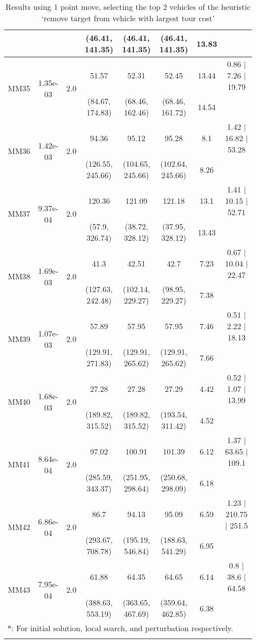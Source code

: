\begin{longtable}{|c|c|c|c|c|c|c|c|}
	 &  &  & (46.41, 141.35) & (46.41, 141.35) & (46.41, 141.35) & 13.83 & \\
 	\hline
	\multirow{2}{*}{MM35} & \multirow{2}{*}{1.35e-03} & \multirow{2}{*}{2.0} & 51.57 & 52.31 & 52.45 & 13.44 & 0.86 $\mid$ 7.26 $\mid$ 19.79\\
	 &  &  & (84.67, 174.83) & (68.46, 162.46) & (68.46, 161.72) & 14.54 & \\
 	\hline
	\multirow{2}{*}{MM36} & \multirow{2}{*}{1.42e-03} & \multirow{2}{*}{2.0} & 94.36 & 95.12 & 95.28 & 8.1 & 1.42 $\mid$ 16.82 $\mid$ 53.28\\
	 &  &  & (126.55, 245.66) & (104.65, 245.66) & (102.64, 245.66) & 8.26 & \\
 	\hline
	\multirow{2}{*}{MM37} & \multirow{2}{*}{9.37e-04} & \multirow{2}{*}{2.0} & 120.36 & 121.09 & 121.18 & 13.1 & 1.41 $\mid$ 10.15 $\mid$ 52.71\\
	 &  &  & (57.9, 326.74) & (38.72, 328.12) & (37.95, 328.12) & 13.43 & \\
 	\hline
	\multirow{2}{*}{MM38} & \multirow{2}{*}{1.69e-03} & \multirow{2}{*}{2.0} & 41.3 & 42.51 & 42.7 & 7.23 & 0.67 $\mid$ 10.04 $\mid$ 22.47\\
	 &  &  & (127.63, 242.48) & (102.14, 229.27) & (98.95, 229.27) & 7.38 & \\
 	\hline
	\multirow{2}{*}{MM39} & \multirow{2}{*}{1.07e-03} & \multirow{2}{*}{2.0} & 57.89 & 57.95 & 57.95 & 7.46 & 0.51 $\mid$ 2.22 $\mid$ 18.13\\
	 &  &  & (129.91, 271.83) & (129.91, 265.62) & (129.91, 265.62) & 7.66 & \\
 	\hline
	\multirow{2}{*}{MM40} & \multirow{2}{*}{1.68e-03} & \multirow{2}{*}{2.0} & 27.28 & 27.28 & 27.29 & 4.42 & 0.52 $\mid$ 1.07 $\mid$ 13.99\\
	 &  &  & (189.82, 315.52) & (189.82, 315.52) & (193.54, 311.42) & 4.52 & \\
 	\hline
	\multirow{2}{*}{MM41} & \multirow{2}{*}{8.64e-04} & \multirow{2}{*}{2.0} & 97.02 & 100.91 & 101.39 & 6.12 & 1.37 $\mid$ 63.65 $\mid$ 109.1\\
	 &  &  & (285.59, 343.37) & (251.95, 298.64) & (250.68, 298.09) & 6.18 & \\
 	\hline
	\multirow{2}{*}{MM42} & \multirow{2}{*}{6.86e-04} & \multirow{2}{*}{2.0} & 86.7 & 94.13 & 95.09 & 6.59 & 1.23 $\mid$ 210.75 $\mid$ 251.5\\
	 &  &  & (293.67, 708.78) & (195.19, 546.84) & (188.63, 541.29) & 6.95 & \\
 	\hline
	\multirow{2}{*}{MM43} & \multirow{2}{*}{7.95e-04} & \multirow{2}{*}{2.0} & 61.88 & 64.35 & 64.65 & 6.14 & 0.8 $\mid$ 38.6 $\mid$ 64.58\\
	 &  &  & (388.63, 553.19) & (363.65, 467.69) & (359.64, 462.85) & 6.38 & \\
 	\hline
	\multicolumn{8}{l}{$^{\mathrm{\boldsymbol{a}}}$: For initial solution, local search, and perturbation respectively.}\\

\caption{Results using 1 point move, selecting the top 2 vehicles of the heuristic \lq remove target from vehicle with largest tour cost\rq }
\end{longtable}
